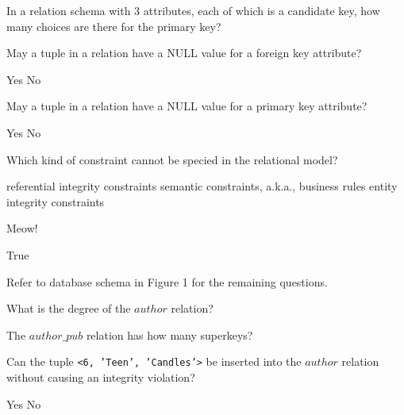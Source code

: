 \documentclass[10pt,a4paper]{exam}
\begin{document}
\begin{questions}
\question[4] In a relation schema with 3 attributes, each of which is a candidate key, how many choices are there for the primary key?

\begin{choices}
\end{choices}

\question[4] May a tuple in a relation have a NULL value for a foreign key attribute?

\begin{choices}
\correctchoice Yes
\choice No
\end{choices}

\question[4] May a tuple in a relation have a NULL value for a primary key attribute?

\begin{choices}
\choice Yes
\correctchoice No
\end{choices}

\question[4] Which kind of constraint cannot be specied in the relational model?

\begin{choices}
\choice referential integrity constraints
\choice semantic constraints, a.k.a., business rules
\choice entity integrity constraints
\end{choices}

\question[4] Meow!

\begin{choices}
\correctchoice True
\end{choices}


\newpage

Refer to database schema in Figure 1 for the remaining questions.

\question[4] What is the degree of the $author$ relation?

\begin{choices}
\end{choices}

\question[4] The $author\_pub$ relation has how many superkeys?

\begin{choices}
\end{choices}

\question[4] Can the tuple {\tt <6, 'Teen', 'Candles'>} be inserted into the $author$ relation without causing an integrity violation?

\begin{choices}
\choice Yes
\correctchoice No
\end{choices}


\end{questions}
\end{document}
